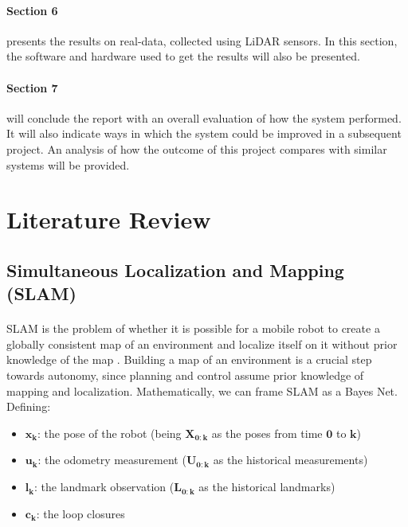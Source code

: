 \documentclass[12pt]{article}
\begin{document}
		\paragraph{Section 6} presents the results on real-data, collected using LiDAR sensors. In this section, the software and hardware used to get the results will also be presented.
		
		\paragraph{Section 7} will conclude the report with an overall evaluation of how the system performed. It will also indicate ways in which the system could be improved in a subsequent project. An analysis of how the outcome of this project compares with similar systems will be provided.

	\newpage
	\section{Literature Review}
	\subsection{Simultaneous Localization and Mapping (SLAM)}
	\label{subs:SLAMRev}
	\paragraph{}
	SLAM is the problem of whether it is possible for a mobile robot to create a globally consistent map of an environment and localize itself on it without prior knowledge of the map \cite{SLAMPartI}\cite{Cadena}. Building a map of an environment is a crucial step towards autonomy, since planning and control assume prior knowledge of mapping and localization. Mathematically, we can frame SLAM as a Bayes Net. Defining:
	
	\begin{itemize}
		\item $\mathbf{x_k}$: the pose of the robot (being $\mathbf{X_{0:k}}$ as the poses from time $\mathbf{0}$ to $\mathbf{k}$)
		\item $\mathbf{u_k}$: the odometry measurement ($\mathbf{U_{0:k}}$ as the historical measurements)
		\item $\mathbf{l_k}$: the landmark observation ($\mathbf{L_{0:k}}$ as the historical landmarks)
		\item $\mathbf{c_k}$: the loop closures
	\end{itemize}
\end{document}
